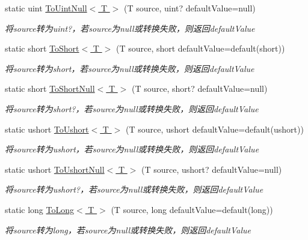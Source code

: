 \begin{DoxyCompactItemize}
static uint \hyperlink{class_x_c_l_net_tools_1_1_common_1_1_data_type_convert_a63c3910b114a8542d2dfebee31d897e2}{To\+Uint\+Null$<$ T $>$} (T source, uint? default\+Value=null)
\begin{DoxyCompactList}\small\item\em 将source转为uint?，若source为null或转换失败，则返回default\+Value \end{DoxyCompactList}\item 
static short \hyperlink{class_x_c_l_net_tools_1_1_common_1_1_data_type_convert_a2f311afdf05703ddfc64d2c897d39e1f}{To\+Short$<$ T $>$} (T source, short default\+Value=default(short))
\begin{DoxyCompactList}\small\item\em 将source转为short，若source为null或转换失败，则返回default\+Value \end{DoxyCompactList}\item 
static short \hyperlink{class_x_c_l_net_tools_1_1_common_1_1_data_type_convert_a8eaeeb2241e1df4507bb77db28b97127}{To\+Short\+Null$<$ T $>$} (T source, short? default\+Value=null)
\begin{DoxyCompactList}\small\item\em 将source转为short?，若source为null或转换失败，则返回default\+Value \end{DoxyCompactList}\item 
static ushort \hyperlink{class_x_c_l_net_tools_1_1_common_1_1_data_type_convert_ae848ec8ce2c88dc9ee801ed64e761ca3}{To\+Ushort$<$ T $>$} (T source, ushort default\+Value=default(ushort))
\begin{DoxyCompactList}\small\item\em 将source转为ushort，若source为null或转换失败，则返回default\+Value \end{DoxyCompactList}\item 
static ushort \hyperlink{class_x_c_l_net_tools_1_1_common_1_1_data_type_convert_a19f22aa7acd170b63f8dc78d1b508cee}{To\+Ushort\+Null$<$ T $>$} (T source, ushort? default\+Value=null)
\begin{DoxyCompactList}\small\item\em 将source转为ushort?，若source为null或转换失败，则返回default\+Value \end{DoxyCompactList}\item 
static long \hyperlink{class_x_c_l_net_tools_1_1_common_1_1_data_type_convert_a0fb66f094f40b602918778139b4cc9df}{To\+Long$<$ T $>$} (T source, long default\+Value=default(long))
\begin{DoxyCompactList}\small\item\em 将source转为long，若source为null或转换失败，则返回default\+Value \end{DoxyCompactList}\item 

\end{DoxyCompactItemize}

